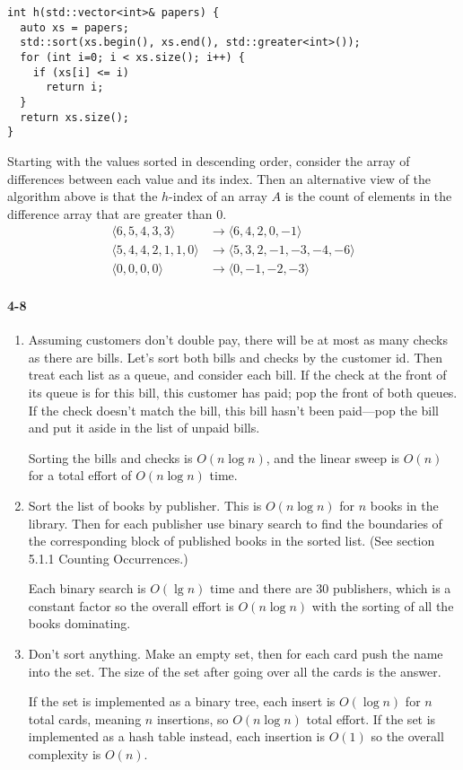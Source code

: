 \documentclass{report}
\begin{document}
\begin{lstlisting}
int h(std::vector<int>& papers) {
  auto xs = papers;
  std::sort(xs.begin(), xs.end(), std::greater<int>());
  for (int i=0; i < xs.size(); i++) {
    if (xs[i] <= i)
      return i;
  }
  return xs.size();
}
\end{lstlisting}

Starting with the values sorted in descending order, consider the array of differences between each value and its index. Then an alternative view of the algorithm above is that the $h$-index of an array $A$ is the count of elements in the difference array that are greater than 0.
\begin{align*}
	\langle 6,5,4,3,3 \rangle &\rightarrow \langle 6,4,2,0,-1 \rangle \\
	\langle 5,4,4,2,1,1,0 \rangle &\rightarrow \langle 5,3,2,-1,-3,-4,-6 \rangle \\
	\langle 0,0,0,0 \rangle &\rightarrow \langle 0,-1,-2,-3 \rangle
\end{align*}

\paragraph{4-8}
\begin{enumerate}[label=(\alph*)]
	\item Assuming customers don't double pay, there will be at most as many checks as there are bills. Let's sort both bills and checks by the customer id. Then treat each list as a queue, and consider each bill. If the check at the front of its queue is for this bill, this customer has paid; pop the front of both queues. If the check doesn't match the bill, this bill hasn't been paid---pop the bill and put it aside in the list of unpaid bills.
	
	Sorting the bills and checks is $O(n\log n)$, and the linear sweep is $O(n)$ for a total effort of $O(n\log n)$ time.
	
	\item Sort the list of books by publisher. This is $O(n\log n)$ for $n$ books in the library. Then for each publisher use binary search to find the boundaries of the corresponding block of published books in the sorted list. (See section 5.1.1 Counting Occurrences.)
	
	Each binary search is $O(\lg n)$ time and there are 30 publishers, which is a constant factor so the overall effort is $O(n\log n)$ with the sorting of all the books dominating.
	
	\item Don't sort anything. Make an empty set, then for each card push the name into the set. The size of the set after going over all the cards is the answer.
	
	If the set is implemented as a binary tree, each insert is $O(\log n)$ for $n$ total cards, meaning $n$ insertions, so $O(n\log n)$ total effort. If the set is implemented as a hash table instead, each insertion is $O(1)$ so the overall complexity is $O(n)$.
\end{enumerate}
\end{document}
